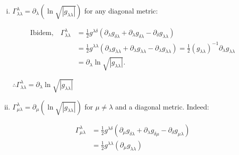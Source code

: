 \documentclass[12pt]{report}
\begin{document}
\begin{enumerate}[(i)]
		
		\begin{align*}
			\Rightarrow \Gamma_{\mu\lambda}^\lambda &= \frac{1}{2} g^{\lambda\delta} (\partial_\lambda g_{\delta\mu} + \partial_\mu g_{\delta\lambda} - \partial_\delta g_{\mu\lambda}) 
			= \frac{1}{2} g^{\lambda\lambda} (\partial_\lambda g_{\lambda\mu} + \partial_\mu g_{\lambda\lambda} - \partial_\lambda g_{\mu\lambda}) \\
			&= \frac{1}{2} g^{\lambda\lambda} \partial_\mu g_{\lambda\lambda} = \frac{1}{2} (g_{\lambda\lambda})^{-1} \partial_\mu g_{\lambda\lambda}
			= \frac{1}{2} \partial_\mu \ln |g_{\lambda\lambda}| \quad \text{because } g_{\lambda\lambda} <0 \text { o } g_{\lambda\lambda}>0 \\
			&= \partial_\mu \ln \sqrt{|g_{\lambda\lambda}|}.
		\end{align*}
		
		
		$\therefore \boxed{\Gamma_{\mu\lambda}^\lambda = \partial_\mu \ln\sqrt{|g_{\lambda\lambda}|}}$
		
		\item $\Gamma_{\lambda\lambda}^\lambda = \partial_\lambda(\ln\sqrt{|g_{\lambda\lambda}|})$ \quad for any diagonal metric:
		
		\begin{align*}
			\text{Ibidem,} \quad \Gamma_{\lambda\lambda}^\lambda &= \frac{1}{2} g^{\lambda\delta} (\partial_\lambda g_{\delta\lambda} + \partial_\lambda g_{\delta\lambda} - \partial_\delta g_{\lambda\lambda}) \\
			&= \frac{1}{2} g^{\lambda\lambda} (\partial_\lambda g_{\lambda\lambda} + \partial_\lambda g_{\lambda\lambda} - \partial_\lambda g_{\lambda\lambda}) = \frac{1}{2} (g_{\lambda\lambda})^{-1} \partial_\lambda g_{\lambda\lambda} \\
			&= \partial_\lambda \ln \sqrt{|g_{\lambda\lambda}|}.
		\end{align*}
		
		
		$\therefore \boxed{\Gamma_{\lambda\lambda}^\lambda = \partial_\lambda \ln\sqrt{|g_{\lambda\lambda}|}}$
		
		
		\item $\Gamma_{\mu\lambda}^\lambda = \partial_\mu(\ln\sqrt{|g_{\lambda\lambda}|})$ \quad for $\mu\neq\lambda$ and a diagonal metric. Indeed:
		
		
		\begin{align*}
			\Gamma^\lambda_{\mu\lambda} 
			&= \frac{1}{2} g^{\lambda\delta} (\partial_\mu g_{\delta\lambda} + \partial_\lambda g_{\delta\mu} - \partial_\delta g_{\mu\lambda}) \\
			&= \frac{1}{2} g^{\lambda\lambda} (\partial_\mu g_{\lambda\lambda}) 
		\end{align*}
		

\end{enumerate}
\end{document}
